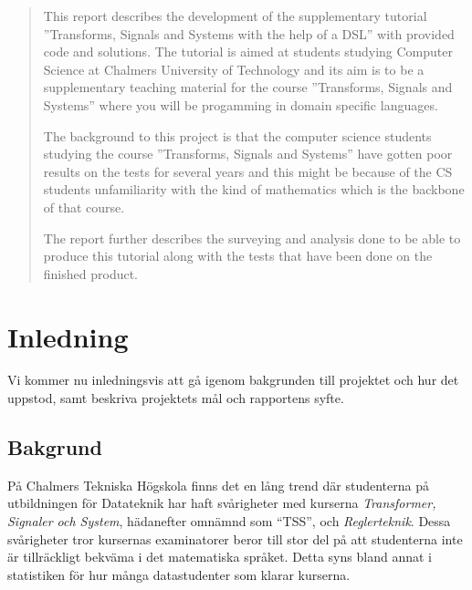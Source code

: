 \documentclass[]{article}
\begin{document}
\renewcommand*\abstractname{Abstract}
\begin{abstract}
This report describes the development of the supplementary tutorial ''Transforms, Signals and Systems with the help of a DSL'' with provided code and solutions.
The tutorial is aimed at students studying Computer Science at Chalmers University of Technology and its aim is to be a supplementary teaching material for the course ''Transforms, Signals and Systems'' where you will be progamming in domain specific languages.

The background to this project is that the computer science students studying the course ''Transforms, Signals and Systems'' have gotten poor results on the tests for several years and this might be because of the CS students unfamiliarity with the kind of mathematics which is the backbone of that course. 

The report further describes the surveying and analysis done to be able to produce this tutorial along with the tests that have been done on the finished product.
\end{abstract}
\newpage



\newpage
\tableofcontents

\newpage

\printglossary[title=Ordlista,nonumberlist]

\newpage

\setlength{\parskip}{2mm}
\setlength{\parindent}{0pt}


\section{Inledning}
Vi kommer nu inledningsvis att gå igenom bakgrunden till projektet och hur det
uppstod, samt beskriva projektets mål och rapportens syfte.

\subsection{Bakgrund}
%

På Chalmers Tekniska Högskola finns det en lång trend där
studenterna på utbildningen för Datateknik har haft svårigheter
med kurserna \textit{Transformer, Signaler och System}, hädanefter omnämnd
som ``\gls{TSS}'', och \textit{Reglerteknik}.
Dessa svårigheter tror kursernas examinatorer beror till stor del på att
studenterna inte är tillräckligt bekväma i det matematiska språket.
Detta syns bland annat i statistiken för hur många datastudenter som
klarar kurserna.
\end{document}
